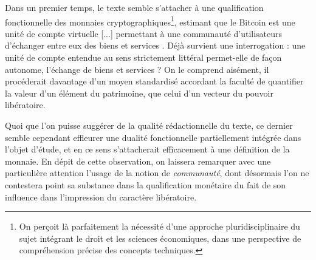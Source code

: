 {Dans un premier temps, le texte semble s'attacher à une qualification fonctionnelle des monnaies cryptographiques\footnote{On perçoit là parfaitement la nécessité d'une approche pluridisciplinaire du sujet intégrant le droit et les sciences économiques, dans une perspective de compréhension précise des concepts techniques.}, estimant que \og le Bitcoin est une unité de compte virtuelle [...]  permettant à une communauté d'utilisateurs d'échanger entre eux des biens et services \fg. Déjà survient une interrogation : une unité de compte entendue au sens strictement littéral permet-elle de façon autonome, l'échange de biens et services ? On le comprend aisément, il procéderait davantage d'un moyen standardisé accordant la faculté de quantifier la valeur d'un élément du patrimoine, que celui d'un vecteur du pouvoir libératoire.\par

Quoi que l'on puisse suggérer de la qualité rédactionnelle du texte, ce dernier semble cependant effleurer une dualité fonctionnelle partiellement intégrée dans l'objet d'étude, et en ce sens s'attacherait efficacement à une définition de la monnaie. En dépit de cette observation, on laissera remarquer avec une particulière attention l'usage de la notion de \emph{communauté}, dont désormais l'on ne contestera point sa substance dans la qualification monétaire du fait de son influence dans l'impression du caractère libératoire.\par

}
